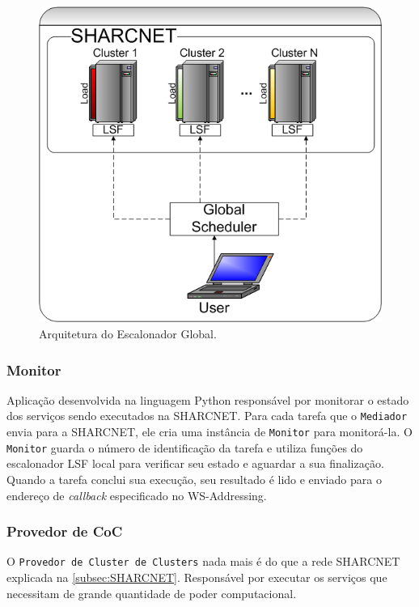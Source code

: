 \documentclass[12pt]{report} %
\begin{document}
	    \begin{figure}[!htb]%
		\begin{center}
		    \includegraphics[scale=0.36]{imagens/scheduler.png} 
		    \caption{Arquitetura do Escalonador Global.}
		    \label{fig:SchedulerArchitecture}
		\end{center}
	    \end{figure}	 
	
	\subsubsection{Monitor}
	\label{subsec:Monitor}
	Aplicação desenvolvida na linguagem Python responsável por monitorar o estado dos serviços sendo executados na SHARCNET.
	Para cada tarefa que o \texttt{Mediador} envia para a SHARCNET, ele cria uma instância de \texttt{Monitor} para monitorá-la.
	O \texttt{Monitor} guarda o número de identificação da tarefa e utiliza funções do escalonador LSF local para verificar seu estado e aguardar a sua finalização.
	Quando a tarefa conclui sua execução, seu resultado é lido e enviado para o endereço de \textit{callback} especificado no WS-Addressing.
	
	\subsubsection{Provedor de CoC}
	O \texttt{Provedor de Cluster de Clusters} nada mais é do que a rede SHARCNET explicada na \autoref{subsec:SHARCNET}. Responsável por executar os serviços que necessitam de grande quantidade de poder computacional.
	
\end{document}
